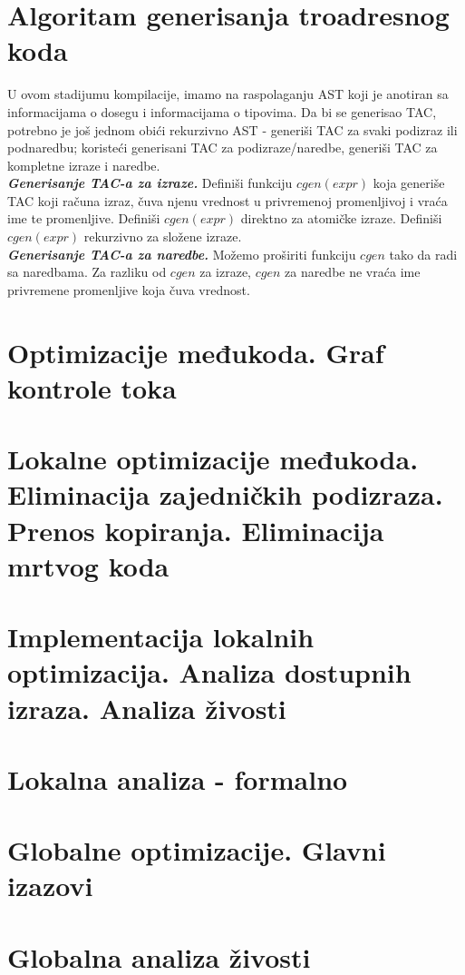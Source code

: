 \documentclass[10pt]{extarticle}
\begin{document}
\section{Algoritam generisanja troadresnog koda}
\noindent
U ovom stadijumu kompilacije, imamo na raspolaganju AST koji je anotiran sa informacijama o dosegu i informacijama o tipovima. Da bi se generisao TAC, potrebno je još jednom obići rekurzivno AST - generiši TAC za svaki podizraz ili podnaredbu; koristeći generisani TAC za podizraze/naredbe, generiši TAC za kompletne izraze i naredbe.\\
\textit{\textbf{Generisanje TAC-a za izraze.}} Definiši funkciju $cgen(expr)$ koja generiše TAC koji računa izraz, čuva njenu vrednost u privremenoj promenljivoj i vraća ime te promenljive. Definiši $cgen(expr)$ direktno za atomičke izraze. Definiši $cgen(expr)$ rekurzivno za složene izraze.\\
\textit{\textbf{Generisanje TAC-a za naredbe.}} Možemo proširiti funkciju $cgen$ tako da radi sa naredbama. Za razliku od $cgen$ za izraze, $cgen$ za naredbe ne vraća ime privremene promenljive koja čuva vrednost.


\section{Optimizacije međukoda. Graf kontrole toka}

\section{Lokalne optimizacije međukoda. Eliminacija zajedničkih podizraza. Prenos kopiranja. Eliminacija mrtvog koda}

\section{Implementacija lokalnih optimizacija. Analiza dostupnih izraza. Analiza živosti}

\section{Lokalna analiza - formalno}

\section{Globalne optimizacije. Glavni izazovi}

\section{Globalna analiza živosti}
\end{document}
